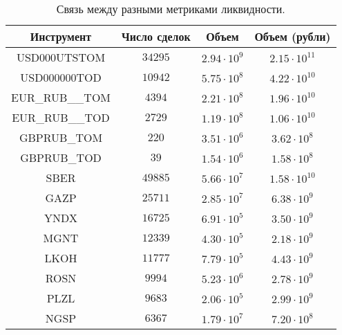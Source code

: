 \begin{table}[h!]
    \begin{center}
        \begin{tabular}{|c|c|c|c|}
            \hline
            Инструмент        & Число сделок & Объем & Объем (рубли) \\ \hline 
            USD000UTSTOM    & $ 34295             $ & $ 2.94 \cdot 10^9 $ & $ 2.15 \cdot 10^{11} $  \\ \hline 
            USD000000TOD    & $ 10942             $ & $ 5.75 \cdot 10^8 $ & $ 4.22 \cdot 10^{10} $  \\ \hline
            EUR\_RUB\_\_TOM & $ 4394              $ & $ 2.21 \cdot 10^8 $ & $ 1.96 \cdot 10^{10} $  \\ \hline
            EUR\_RUB\_\_TOD & $ 2729              $ & $ 1.19 \cdot 10^8 $ & $ 1.06 \cdot 10^{10} $  \\ \hline
            GBPRUB\_TOM     & $ 220               $ & $ 3.51 \cdot 10^6 $ & $ 3.62 \cdot 10^{8 } $  \\ \hline
            GBPRUB\_TOD     & $ 39                $ & $ 1.54 \cdot 10^6 $ & $ 1.58 \cdot 10^{8 } $  \\ \hline
            SBER            & $49885              $ & $ 5.66 \cdot 10^7 $ & $ 1.58 \cdot 10^{10} $  \\ \hline
            GAZP            & $25711              $ & $ 2.85 \cdot 10^7 $ & $ 6.38 \cdot 10^{ 9} $  \\ \hline
            YNDX            & $16725              $ & $ 6.91 \cdot 10^5 $ & $ 3.50 \cdot 10^{ 9} $  \\ \hline
            MGNT            & $12339              $ & $ 4.30 \cdot 10^5 $ & $ 2.18 \cdot 10^{ 9} $  \\ \hline
            LKOH            & $11777$               & $ 7.79 \cdot 10^5 $ & $ 4.43 \cdot 10^{ 9} $  \\ \hline
            ROSN            & $9994$                & $ 5.23 \cdot 10^6 $ & $ 2.78 \cdot 10^{ 9} $  \\ \hline
            PLZL            & $9683$                & $ 2.06 \cdot 10^5 $ & $ 2.99 \cdot 10^{ 9} $  \\ \hline
            NGSP            & $6367$                & $ 1.79 \cdot 10^7 $ & $ 7.20 \cdot 10^{ 8} $  \\ \hline
        \end{tabular}
    \end{center}
    \label{liqmetrics}
    \caption{Связь между разными метриками ликвидности.}
\end{table} 
